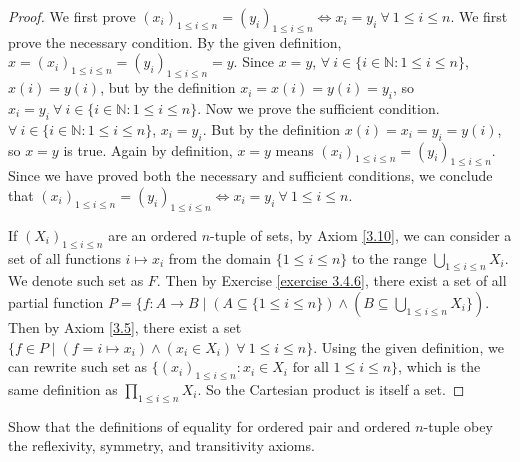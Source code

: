 \begin{proof}
We first prove \((x_i)_{1 \leq i \leq n} = (y_i)_{1 \leq i \leq n} \iff x_i = y_i \ \forall\ 1 \leq i \leq n\).
We first prove the necessary condition.
By the given definition, \(x = (x_i)_{1 \leq i \leq n} = (y_i)_{1 \leq i \leq n} = y\).
Since \(x = y\), \(\forall\ i \in \{i \in \mathds{N}: 1 \leq i \leq n\}\), \(x(i) = y(i)\), but by the definition \(x_i = x(i) = y(i) = y_i\), so \(x_i = y_i \ \forall\ i \in \{i \in \mathds{N} : 1 \leq i \leq n\}\).
Now we prove the sufficient condition.
\(\forall\ i \in \{i \in \mathds{N} : 1 \leq i \leq n\}\), \(x_i = y_i\).
But by the definition \(x(i) = x_i = y_i = y(i)\), so \(x = y\) is true.
Again by definition, \(x = y\) means \((x_i)_{1 \leq i \leq n} = (y_i)_{1 \leq i \leq n}\).
Since we have proved both the necessary and sufficient conditions, we conclude that \((x_i)_{1 \leq i \leq n} = (y_i)_{1 \leq i \leq n} \iff x_i = y_i \ \forall\ 1 \leq i \leq n\).

If \((X_i)_{1 \leq i \leq n}\) are an ordered \(n\)-tuple of sets, by Axiom \ref{3.10}, we can consider a set of all functions \(i \mapsto x_i\) from the domain \(\{1 \leq i \leq n\}\) to the range \(\bigcup_{1 \leq i \leq n} X_i\).
We denote such set as \(F\).
Then by Exercise \ref{exercise 3.4.6}, there exist a set of all partial function \(P = \{f : A \to B \mid (A \subseteq \{1 \leq i \leq n\}) \land (B \subseteq \bigcup_{1 \leq i \leq n} X_i\})\).
Then by Axiom \ref{3.5}, there exist a set \(\{f \in P \mid (f = i \mapsto x_i) \land (x_i \in X_i) \ \forall\ 1 \leq i \leq n\}\).
Using the given definition, we can rewrite such set as \(\{(x_i)_{1 \leq i \leq n} : x_i \in X_i \text{ for all } 1 \leq i \leq n\}\), which is the same definition as \(\prod_{1 \leq i \leq n} X_i\).
So the Cartesian product is itself a set.
\end{proof}

\begin{exercise}\label{exercise 3.5.3}
Show that the definitions of equality for ordered pair and ordered \(n\)-tuple obey the reflexivity, symmetry, and transitivity axioms.
\end{exercise}

